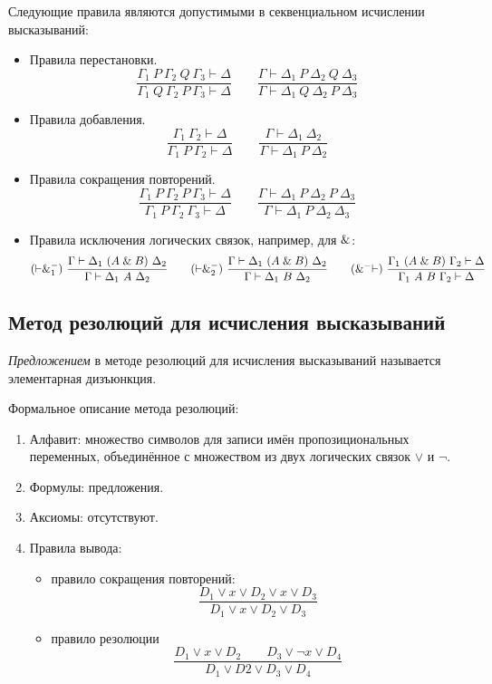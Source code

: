 \begin{statement}
	Следующие правила являются допустимыми в секвенциальном исчислении высказываний:
	\begin{itemize}
		\item Правила перестановки.
			$$ \frac{\Gamma_1~P~\Gamma_2~Q~\Gamma_3 \vdash \Delta}{\Gamma_1~Q~\Gamma_2~P~\Gamma_3 \vdash \Delta} \qquad \frac{\Gamma \vdash \Delta_1~P~\Delta_2~Q~\Delta_3}{\Gamma \vdash \Delta_1~Q~\Delta_2~P~\Delta_3} $$

		\item Правила добавления.
			$$ \frac{\Gamma_1~\Gamma_2 \vdash \Delta}{\Gamma_1~P~\Gamma_2 \vdash \Delta} \qquad \frac{\Gamma \vdash \Delta_1 ~ \Delta_2}{\Gamma \vdash \Delta_1~P~\Delta_2} $$

		\item Правила сокращения повторений.
			$$ \frac{\Gamma_1~P~\Gamma_2~P~\Gamma_3 \vdash \Delta}{\Gamma_1~P~\Gamma_2~\Gamma_3 \vdash \Delta} \qquad \frac{\Gamma \vdash \Delta_1~P~\Delta_2~P~\Delta_3}{\Gamma \vdash \Delta_1~P~\Delta_2~\Delta_3} $$

		\item Правила исключения логических связок, например, для $ \mathrel\& $:
			$$ (\vdash \mathrel\&_1^-) ~ \frac{\Gamma \vdash \Delta_1 ~ (A \mathrel\& B) ~ \Delta_2}{\Gamma \vdash \Delta_1 ~ A ~ \Delta_2} \qquad (\vdash \mathrel\&_2^-) ~ \frac{\Gamma \vdash \Delta_1~ (A \mathrel\& B) ~ \Delta_2}{\Gamma \vdash \Delta_1 ~ B ~ \Delta_2} \qquad (\mathrel\&^- \vdash) ~ \frac{\Gamma_1 ~ (A \mathrel\& B) ~ \Gamma_2 \vdash \Delta}{\Gamma_1 ~ A ~ B ~ \Gamma_2 \vdash \Delta} $$
	\end{itemize}
\end{statement}

\subsection{Метод резолюций для исчисления высказываний}

\emph{Предложением} в методе резолюций для исчисления высказываний называется элементарная дизъюнкция.

Формальное описание метода резолюций:
\begin{enumerate}
	\item Алфавит: множество символов для записи имён пропозициональных переменных, объединённое с множеством из двух логических связок $ \vee $ и $ \neg $.
	\item Формулы: предложения.
	\item Аксиомы: отсутствуют.
	\item Правила вывода:
		\begin{itemize}
			\item правило сокращения повторений:
				$$ \frac{D_1 \vee x \vee D_2 \vee x \vee D_3}{D_1 \vee x \vee D_2 \vee D_3} $$
			\item правило резолюции
				$$ \frac{D_1 \vee x \vee D_2 \qquad D_3 \vee \neg x \vee D_4}{D_1 \vee D2 \vee D_3 \vee D_4} $$
		\end{itemize}
\end{enumerate}

